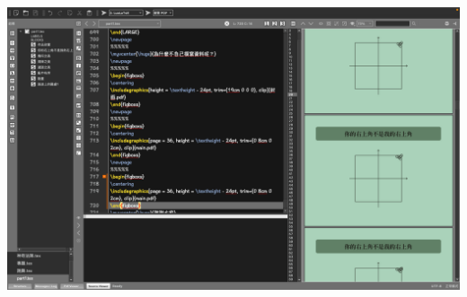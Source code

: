 \newpage
\begin{figboxs}
\centering
\includegraphics[width = \textwidth - 24pt]{texmaker.png}
\end{figboxs}
\newpage
\newpage
